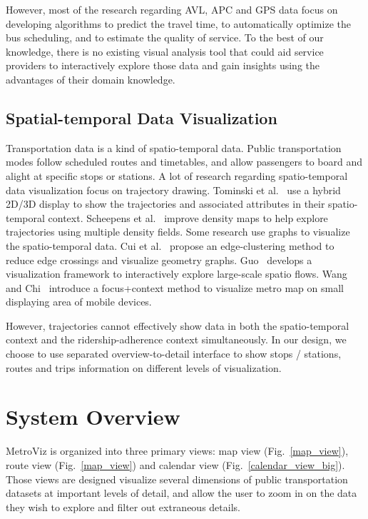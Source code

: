 \documentclass[journal]{vgtc}                %
\begin{document}
However, most of the research regarding AVL, APC and GPS data focus on developing algorithms to predict the travel time, to automatically optimize the bus scheduling, and to estimate the quality of service. To the best of our knowledge, there is no existing visual analysis tool that could aid service providers to interactively explore those data and gain insights using the advantages of their domain knowledge.

\subsection{Spatial-temporal Data Visualization}
Transportation data is a kind of spatio-temporal data. Public transportation modes follow scheduled routes and timetables, and allow passengers to board and alight at specific stops or stations. A lot of research regarding spatio-temporal data visualization focus on trajectory drawing. 
Tominski et al.~\cite{Tominski2012} use a hybrid 2D/3D display to show the trajectories and associated attributes in their spatio-temporal context.
Scheepens et al.~\cite{6065019} improve density maps to help explore trajectories using multiple density fields.
Some research use graphs to visualize the spatio-temporal data.
Cui et al.~\cite{4658140} propose an edge-clustering method to reduce edge crossings and visualize geometry graphs.
Guo~\cite{5290710} develops a visualization framework to interactively explore large-scale spatio flows.
Wang and Chi~\cite{6065020} introduce a focus+context method to visualize metro map on small displaying area of mobile devices.

However, trajectories cannot effectively show data in both the spatio-temporal context and the ridership-adherence context simultaneously. In our design, we choose to use separated overview-to-detail interface to show stops / stations, routes and trips information on different levels of visualization.

\section{System Overview}
MetroViz is organized into three primary views: map view (Fig.~\ref{map_view}), route view (Fig.~\ref{map_view}) and calendar view (Fig.~\ref{calendar_view_big}). Those views are designed visualize several dimensions of public transportation datasets at important levels of detail, and allow the user to zoom in on the data they wish to explore and filter out extraneous details.
\end{document}
